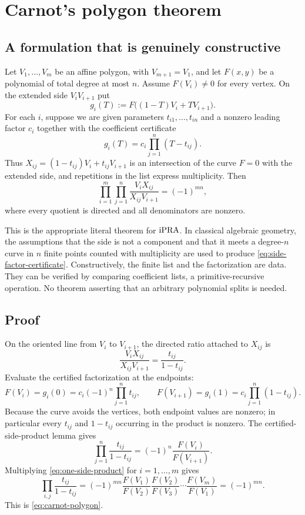 \section{Carnot's polygon theorem}

\subsection{A formulation that is genuinely constructive}

Let $V_1,\ldots,V_m$ be an affine polygon, with $V_{m+1}=V_1$, and let
$F(x,y)$ be a polynomial of total degree at most $n$.  Assume $F(V_i)\ne0$
for every vertex.  On the extended side $V_iV_{i+1}$ put
\[
  g_i(T):=F\bigl((1-T)V_i+T V_{i+1}\bigr).
\]
For each $i$, suppose we are given parameters $t_{i1},\ldots,t_{in}$ and a
nonzero leading factor $c_i$ together with the coefficient certificate
\begin{equation}\label{eq:side-factor-certificate}
  g_i(T)=c_i\prod_{j=1}^{n}(T-t_{ij}).
\end{equation}
Thus $X_{ij}=(1-t_{ij})V_i+t_{ij}V_{i+1}$ is an intersection of the curve
$F=0$ with the extended side, and repetitions in the list express
multiplicity.  Then
\begin{equation}\label{eq:carnot-polygon}
 \prod_{i=1}^{m}\prod_{j=1}^{n}
 \frac{V_iX_{ij}}{X_{ij}V_{i+1}}
 =(-1)^{mn},
\end{equation}
where every quotient is directed and all denominators are nonzero.

This is the appropriate literal theorem for $\mathrm{iPRA}$.  In classical algebraic
geometry, the assumptions that the side is not a component and that it meets a
degree-$n$ curve in $n$ finite points counted with multiplicity are used to
produce \eqref{eq:side-factor-certificate}.  Constructively, the finite list
and the factorization are data.  They can be verified by comparing
coefficient lists, a primitive-recursive operation.  No theorem asserting that
an arbitrary polynomial splits is needed.

\subsection{Proof}

On the oriented line from $V_i$ to $V_{i+1}$, the directed ratio attached to
$X_{ij}$ is
\[
 \frac{V_iX_{ij}}{X_{ij}V_{i+1}}=\frac{t_{ij}}{1-t_{ij}}.
\]
Evaluate the certified factorization at the endpoints:
\[
 F(V_i)=g_i(0)=c_i(-1)^n\prod_{j=1}^{n}t_{ij},
 \qquad
 F(V_{i+1})=g_i(1)=c_i\prod_{j=1}^{n}(1-t_{ij}).
\]
Because the curve avoids the vertices, both endpoint values are nonzero; in
particular every $t_{ij}$ and $1-t_{ij}$ occurring in the product is nonzero.
The certified-side-product lemma gives
\begin{equation}\label{eq:one-side-product}
 \prod_{j=1}^{n}\frac{t_{ij}}{1-t_{ij}}
 =(-1)^n\frac{F(V_i)}{F(V_{i+1})}.
\end{equation}
Multiplying \eqref{eq:one-side-product} for $i=1,\ldots,m$ gives
\[
 \prod_{i,j}\frac{t_{ij}}{1-t_{ij}}
 =(-1)^{mn}
   \frac{F(V_1)}{F(V_2)}
   \frac{F(V_2)}{F(V_3)}\cdots
   \frac{F(V_m)}{F(V_1)}
 =(-1)^{mn}.
\]
This is \eqref{eq:carnot-polygon}.

